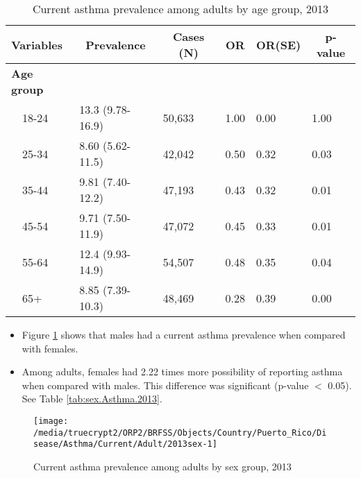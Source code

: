 \begin{table}[H]
\caption{Current asthma prevalence  among adults by age group, 2013\label{tab:age.Asthma.2013}} 
\begin{center}
\begin{tabular}{llllll}
\hline\hline
\multicolumn{1}{l}{Variables}&\multicolumn{1}{c}{Prevalence}&\multicolumn{1}{c}{Cases (N)}&\multicolumn{1}{c}{OR}&\multicolumn{1}{c}{OR(SE)}&\multicolumn{1}{c}{p-value}\tabularnewline
\hline
{\bfseries Age group}&&&&&\tabularnewline
~~18-24&13.3 (9.78-16.9)&50,633&1.00&0.00&1.00\tabularnewline
~~25-34&8.60 (5.62-11.5)&42,042&0.50&0.32&0.03\tabularnewline
~~35-44&9.81 (7.40-12.2)&47,193&0.43&0.32&0.01\tabularnewline
~~45-54&9.71 (7.50-11.9)&47,072&0.45&0.33&0.01\tabularnewline
~~55-64&12.4 (9.93-14.9)&54,507&0.48&0.35&0.04\tabularnewline
~~65+&8.85 (7.39-10.3)&48,469&0.28&0.39&0.00\tabularnewline
\hline
\end{tabular}\end{center}

\end{table}


\newpage
\begin{itemize}

\item Figure \ref{fig:sex.Asthma.2013} shows that males had a 
current asthma prevalence when compared with females.


\item Among adults, females had 2.22 times more possibility of reporting asthma when compared with males. This difference was significant (p-value $<$ 0.05). See Table \ref{tab:sex.Asthma.2013}.

\end{itemize}

\begin{figure}[H]
\caption{Current asthma prevalence among adults by sex group, 
2013}
\begin{knitrout}
\color{fgcolor}

{\centering \texttt{[image: /media/truecrypt2/ORP2/BRFSS/Objects/Country/Puerto\_Rico/Disease/Asthma/Current/Adult/2013sex-1]} 

}



\end{knitrout}
\label{fig:sex.Asthma.2013}
\end{figure}

